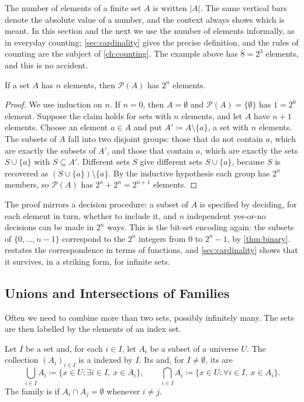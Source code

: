 The number of elements of a finite set $A$ is written $|A|$. The same vertical bars denote the absolute value of a number, and the context always shows which is meant. In this section and the next we use the number of elements informally, as in everyday counting; \cref{sec:cardinality} gives the precise definition, and the rules of counting are the subject of \cref{ch:counting}. The example above has $8=2^3$ elements, and this is no accident.

\begin{proposition}
\label{prop:power-set-size}
If a set $A$ has $n$ elements, then $\mathcal P(A)$ has $2^n$ elements.
\end{proposition}

\begin{proof}
We use induction on $n$. If $n=0$, then $A=\emptyset$ and $\mathcal P(A)=\{\emptyset\}$ has $1=2^0$ element. Suppose the claim holds for sets with $n$ elements, and let $A$ have $n+1$ elements. Choose an element $a\in A$ and put $A'\coloneqq A\setminus\{a\}$, a set with $n$ elements. The subsets of $A$ fall into two disjoint groups: those that do not contain $a$, which are exactly the subsets of $A'$, and those that contain $a$, which are exactly the sets $S\cup\{a\}$ with $S\subseteq A'$. Different sets $S$ give different sets $S\cup\{a\}$, because $S$ is recovered as $(S\cup\{a\})\setminus\{a\}$. By the inductive hypothesis each group has $2^n$ members, so $\mathcal P(A)$ has $2^n+2^n=2^{n+1}$ elements.
\end{proof}

The proof mirrors a decision procedure: a subset of $A$ is specified by deciding, for each element in turn, whether to include it, and $n$ independent yes-or-no decisions can be made in $2^n$ ways. This is the bit-set encoding again: the subsets of $\{0,\ldots,n-1\}$ correspond to the $2^n$ integers from $0$ to $2^n-1$, by \cref{thm:binary}.  restates the correspondence in terms of functions, and \cref{sec:cardinality} shows that it survives, in a striking form, for infinite sets.

\subsection{Unions and Intersections of Families}

Often we need to combine more than two sets, possibly infinitely many. The sets are then labelled by the elements of an index set.

\begin{definition}
\label{def:families}
Let $I$ be a set and, for each $i\in I$, let $A_i$ be a subset of a universe $U$. The collection $(A_i)_{i\in I}$ is a  indexed by $I$. Its  and, for $I\ne\emptyset$, its  are
\[
\bigcup_{i\in I}A_i\coloneqq\{x\in U:\exists i\in I,\ x\in A_i\},
\qquad
\bigcap_{i\in I}A_i\coloneqq\{x\in U:\forall i\in I,\ x\in A_i\}.
\]
The family is  if $A_i\cap A_j=\emptyset$ whenever $i\ne j$.
\end{definition}

